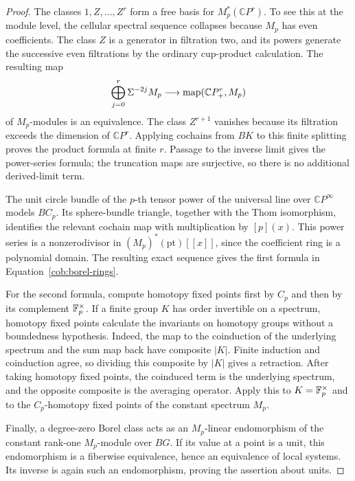 \begin{proof}
 The classes $1,Z,\ldots,Z^r$ form a free basis for
 $M_p^*(\mathbb CP^r)$.  To see this at the module level, the cellular
 spectral sequence collapses because $M_p$ has even coefficients.
 The class $Z$ is a generator in filtration two, and its powers
 generate the successive even filtrations by the ordinary cup-product
 calculation.  The resulting map
 \[
  \bigoplus_{j=0}^r\Sigma^{-2j}M_p
     \longrightarrow\operatorname{map}(\mathbb CP^r_+,M_p)
 \]
 of $M_p$-modules is an equivalence.  The class $Z^{r+1}$ vanishes
 because its filtration exceeds the dimension of $\mathbb CP^r$.
 Applying cochains from $BK$ to this finite splitting proves the
 product formula at finite $r$.  Passage to the inverse limit gives
 the power-series formula; the truncation maps are surjective, so
 there is no additional derived-limit term.

 The unit circle bundle of the $p$-th tensor power of the universal
 line over $\mathbb CP^\infty$ models $BC_p$.  Its sphere-bundle
 triangle, together with the Thom isomorphism, identifies the relevant
 cochain map with multiplication by $[p](x)$.  This power series is a
 nonzerodivisor in $(M_p)^*(\mathrm{pt})[[x]]$, since the coefficient
 ring is a polynomial domain.  The resulting exact sequence gives
 the first formula in Equation~\eqref{cob:borel-rings}.

 For the second formula, compute homotopy fixed points first by $C_p$
 and then by its complement $\mathbb F_p^\times$.  If a finite group $K$ has
 order invertible on a spectrum, homotopy fixed points calculate the
 invariants on homotopy groups without a boundedness hypothesis.
 Indeed, the map to the coinduction of the underlying spectrum and
 the sum map back have composite $|K|$.  Finite induction and
 coinduction agree, so dividing this composite by $|K|$ gives a
 retraction.  After taking homotopy fixed points, the coinduced term
 is the underlying spectrum, and the opposite composite is the
 averaging operator.  Apply this to $K=\mathbb F_p^\times$ and to the
 $C_p$-homotopy fixed points of the constant spectrum $M_p$.

 Finally, a degree-zero Borel class acts as an $M_p$-linear
 endomorphism of the constant rank-one $M_p$-module over $BG$.
 If its value at a point is a unit, this endomorphism is a fiberwise
 equivalence, hence an equivalence of local systems.  Its inverse is
 again such an endomorphism, proving the assertion about units.
\end{proof}

